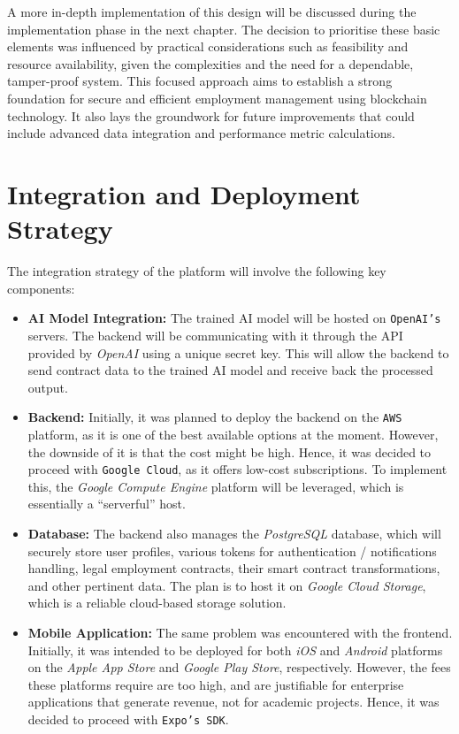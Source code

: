 A more in-depth implementation of this design will be discussed during the implementation phase in the next chapter. The decision to prioritise these basic elements was influenced by practical considerations such as feasibility and resource availability, given the complexities and the need for a dependable, tamper-proof system. This focused approach aims to establish a strong foundation for secure and efficient employment management using blockchain technology. It also lays the groundwork for future improvements that could include advanced data integration and performance metric calculations.

\section{Integration and Deployment Strategy}

The integration strategy of the platform will involve the following key components:

\begin{itemize}
    \item \textbf{AI Model Integration:} The trained AI model will be hosted on \texttt{OpenAI's} servers. The backend will be communicating with it through the API provided by \textit{OpenAI} using a unique secret key. This will allow the backend to send contract data to the trained AI model and receive back the processed output.
    \item \textbf{Backend:} Initially, it was planned to deploy the backend on the \texttt{AWS} platform, as it is one of the best available options at the moment. However, the downside of it is that the cost might be high. Hence, it was decided to proceed with \texttt{Google Cloud}, as it offers low-cost subscriptions. To implement this, the \textit{Google Compute Engine} platform will be leveraged, which is essentially a ``serverful'' host.
    \item \textbf{Database:} The backend also manages the \textit{PostgreSQL} database, which will securely store user profiles, various tokens for authentication / notifications handling, legal employment contracts, their smart contract transformations, and other pertinent data. The plan is to host it on \textit{Google Cloud Storage}, which is a reliable cloud-based storage solution.
    \item \textbf{Mobile Application:} The same problem was encountered with the frontend. Initially, it was intended to be deployed for both \textit{iOS} and \textit{Android} platforms on the \textit{Apple App Store} and \textit{Google Play Store}, respectively. However, the fees these platforms require are too high, and are justifiable for enterprise applications that generate revenue, not for academic projects. Hence, it was decided to proceed with \texttt{Expo's SDK}.
\end{itemize}